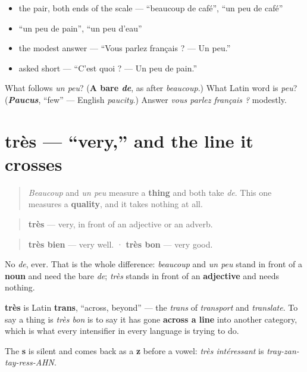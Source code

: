 \begin{itemize}
\raggedright
  \item the pair, both ends of the scale — \textquotedblleft{}beaucoup de café\textquotedblright{}, \textquotedblleft{}un peu de café\textquotedblright{}
  \item \textquotedblleft{}un peu de pain\textquotedblright{}, \textquotedblleft{}un peu d'eau\textquotedblright{}
  \item the modest answer — \textquotedblleft{}Vous parlez français ? — Un peu.\textquotedblright{}
  \item asked short — \textquotedblleft{}C'est quoi ? — Un peu de pain.\textquotedblright{}
\end{itemize}

\begin{tcolorbox}[breakable,colback=teal!4,colframe=teal!35!black,title={Before you move on}]
What follows \emph{un peu}? (\textbf{A bare \emph{de}}, as after \emph{beaucoup}.) What Latin word is \emph{peu}? (\emph{\textbf{Paucus}}, \textquotedblleft{}few\textquotedblright{} — English \emph{paucity}.) Answer \emph{vous parlez français ?} modestly.
\end{tcolorbox}
\section[très]{très — \textquotedblleft{}very,\textquotedblright{} and the line it crosses}

\label{lesson:FR-C40-tres}



\begin{quote}
\emph{Beaucoup} and \emph{un peu} measure a \textbf{thing} and both take \emph{de}. This one measures a \textbf{quality}, and it takes nothing at all.
\end{quote}

\begin{cousinweb}
\begin{quote}
\textbf{très} — very, in front of an adjective or an adverb.
\end{quote}

\begin{quote}
\textbf{très bien} — very well. · \textbf{très bon} — very good.
\end{quote}

No \emph{de}, ever. That is the whole difference: \emph{beaucoup} and \emph{un peu} stand in front of a \textbf{noun} and need the bare \emph{de}; \emph{très} stands in front of an \textbf{adjective} and needs nothing.

\textbf{très} is Latin \textbf{trans}, \textquotedblleft{}across, beyond\textquotedblright{} — the \emph{trans} of \emph{transport} and \emph{translate}. To say a thing is \emph{très bon} is to say it has gone \textbf{across a line} into another category, which is what every intensifier in every language is trying to do.

The \textbf{s} is silent and comes back as a \textbf{z} before a vowel: \emph{très intéressant} is \emph{tray-zan-tay-ress-AHN}.
\end{cousinweb}

